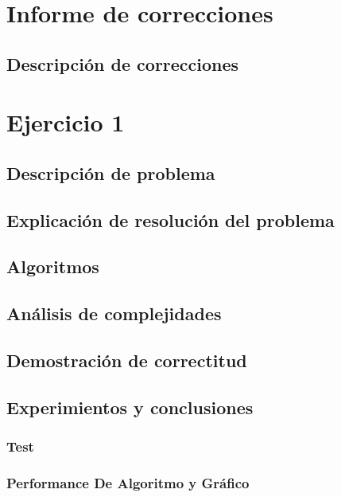 \documentclass[12pt, a4paper]{article}
\begin{document}
\maketitle
\tableofcontents
\newpage

\newpage
\section{Informe de correcciones} 
\subsection{Descripci\'on de correcciones}

\section{Ejercicio 1} 
\subsection{Descripci\'on de problema}

\subsection{Explicaci\'on de resoluci\'on del problema}

\subsection{Algoritmos}

\subsection{An\'alisis de complejidades}

\subsection{Demostraci\'on de correctitud}

\subsection{Experimientos y conclusiones}
\subsubsection[1.5]{Test}

\subsubsection[1.5]{Performance De Algoritmo y Gr\'afico}
%
\end{document}
